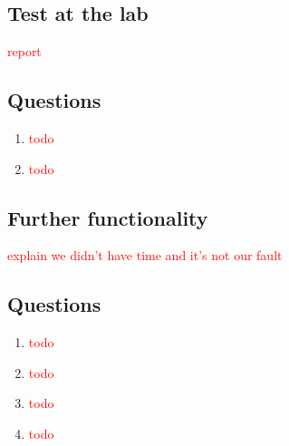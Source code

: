 \documentclass[a4paper,twoside,11pt]{article}
\newcommand{\todo}[1]{\textcolor{red}{#1}}
\begin{document}
\subsection{Test at the lab}
\todo{report}

\subsection{Questions}
\begin{enumerate}
 \item \todo{todo}
 \item \todo{todo}
\end{enumerate}

\subsection{Further functionality}
\todo{explain we didn't have time and it's not our fault}

\subsection{Questions}
\begin{enumerate}
 \item \todo{todo}
 \item \todo{todo}
 \item \todo{todo}
 \item \todo{todo}
\end{enumerate}
\end{document}
